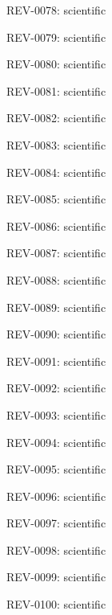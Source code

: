 \documentclass[10pt,openany]{book}
\begin{document}
\noindent REV-0078:  scientific\par

\noindent REV-0079:  scientific\par

\noindent REV-0080:  scientific\par

\noindent REV-0081:  scientific\par

\noindent REV-0082:  scientific\par

\noindent REV-0083:  scientific\par

\noindent REV-0084:  scientific\par

\noindent REV-0085:  scientific\par

\noindent REV-0086:  scientific\par

\noindent REV-0087:  scientific\par

\noindent REV-0088:  scientific\par

\noindent REV-0089:  scientific\par

\noindent REV-0090:  scientific\par

\noindent REV-0091:  scientific\par

\noindent REV-0092:  scientific\par

\noindent REV-0093:  scientific\par

\noindent REV-0094:  scientific\par

\noindent REV-0095:  scientific\par

\noindent REV-0096:  scientific\par

\noindent REV-0097:  scientific\par

\noindent REV-0098:  scientific\par

\noindent REV-0099:  scientific\par

\noindent REV-0100:  scientific\par
\end{document}
